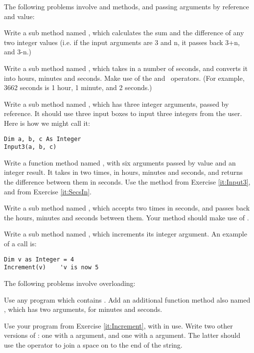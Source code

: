 		The following problems involve  and  methods, and passing arguments by reference and value:
		\begin{EXE}
			\item Write a sub method named , which calculates the sum and the difference of any two integer values (i.e. if the input arguments are 3 and n, it passes back 3+n, and 3-n.)
			\item Write a sub method named , which takes in a number of seconds, and converts it into hours, minutes and seconds. Make use of the  and \ operators. (For example, 3662 seconds is 1 hour, 1 minute, and 2 seconds.)
			\item \label{it:Input3} Write a sub method named , which has three integer arguments, passed by reference. It should use three input boxes to input three integers from the user. Here is how we might call it:
				\begin{lstlisting}
Dim a, b, c As Integer
Input3(a, b, c)
				\end{lstlisting}
			\item Write a function method named , with six arguments passed by value and an integer result. It takes in two times, in hours, minutes and seconds, and returns the difference between them in seconds. Use the  method from Exercise \ref{it:Input3}, and  from Exercise \ref{it:SecsIn}.
			\item Write a sub method named , which accepts two times in seconds, and passes back the hours, minutes and seconds between them. Your method should make use of .
			\item \label{it:Increment} Write a sub method named , which increments its integer argument. An example of a call is:
				\begin{lstlisting}
Dim v as Integer = 4
Increment(v)    'v is now 5
				\end{lstlisting}
		\end{EXE}

		The following problems involve overloading:
		\begin{EXE}
			\item Use any program which contains . Add an additional function method also named , which has two arguments, for minutes and seconds.
			\item Use your program from Exercise \ref{it:Increment}, with  in use. Write two other versions of : one with a  argument, and one with a  argument. The latter should use the \keyword{\&} operator to join a space on to the end of the string.
		\end{EXE}


